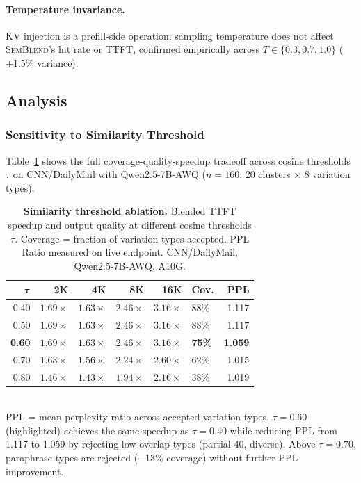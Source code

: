 \documentclass[10pt,twocolumn]{article}
\newcommand{\semblend}{\textsc{SemBlend}\xspace}
\begin{document}
\paragraph{Temperature invariance.}
KV injection is a prefill-side operation: sampling temperature does not
affect \semblend's hit rate or TTFT, confirmed empirically across
$T \in \{0.3, 0.7, 1.0\}$ ($\pm 1.5\%$ variance).

\subsection{Analysis}
\label{sec:analysis}

\subsubsection{Sensitivity to Similarity Threshold}
\label{sec:analysis:threshold}

Table~\ref{tab:threshold-ablation} shows the full coverage-quality-speedup
tradeoff across cosine thresholds $\tau$ on CNN/DailyMail with Qwen2.5-7B-AWQ
($n{=}160$: 20 clusters $\times$ 8 variation types).

\begin{table}[t]
\centering
\caption{\textbf{Similarity threshold ablation.} Blended TTFT speedup
and output quality at different cosine thresholds $\tau$. Coverage =
fraction of variation types accepted. PPL Ratio measured on live
endpoint. CNN/DailyMail, Qwen2.5-7B-AWQ, A10G.}
\label{tab:threshold-ablation}
\scriptsize
\setlength{\tabcolsep}{2.5pt}
\begin{tabular}{@{}rrrrrlr@{}}
\toprule
$\boldsymbol{\tau}$ & \textbf{2K} & \textbf{4K} & \textbf{8K} & \textbf{16K} & \textbf{Cov.} & \textbf{PPL} \\
\midrule
0.40 & $1.69\times$ & $1.63\times$ & $2.46\times$ & $3.16\times$ & 88\% & 1.117 \\
0.50 & $1.69\times$ & $1.63\times$ & $2.46\times$ & $3.16\times$ & 88\% & 1.117 \\
\rowcolor{gray!15}
\textbf{0.60} & $\mathbf{1.69\times}$ & $\mathbf{1.63\times}$ & $\mathbf{2.46\times}$ & $\mathbf{3.16\times}$ & \textbf{75\%} & \textbf{1.059} \\
0.70 & $1.63\times$ & $1.56\times$ & $2.24\times$ & $2.60\times$ & 62\% & 1.015 \\
0.80 & $1.46\times$ & $1.43\times$ & $1.94\times$ & $2.16\times$ & 38\% & 1.019 \\
\bottomrule
\end{tabular}\\[2pt]
{\scriptsize PPL = mean perplexity ratio across accepted variation types.
$\tau{=}0.60$ (highlighted) achieves the same speedup as $\tau{=}0.40$
while reducing PPL from 1.117 to 1.059 by rejecting low-overlap types
(partial-40, diverse). Above $\tau{=}0.70$, paraphrase types are
rejected ($-$13\% coverage) without further PPL improvement.}
\end{table}
\end{document}
